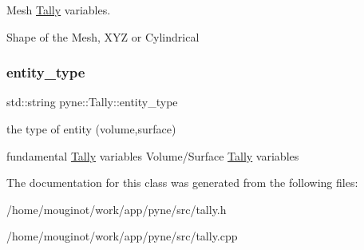 Mesh \hyperlink{classpyne_1_1_tally}{Tally} variables. 

Shape of the Mesh, X\+YZ or Cylindrical \mbox{\label{classpyne_1_1_tally_a8b2e517c759ca71bc7b25c4de5a412f9}} 
\subsubsection{\texorpdfstring{entity\+\_\+type}{entity\_type}}
{\footnotesize\ttfamily std\+::string pyne\+::\+Tally\+::entity\+\_\+type}



the type of entity (volume,surface) 

fundamental \hyperlink{classpyne_1_1_tally}{Tally} variables Volume/\+Surface \hyperlink{classpyne_1_1_tally}{Tally} variables 

The documentation for this class was generated from the following files\+:\begin{DoxyCompactItemize}
\item 
/home/mouginot/work/app/pyne/src/tally.\+h\item 
/home/mouginot/work/app/pyne/src/tally.\+cpp\end{DoxyCompactItemize}

